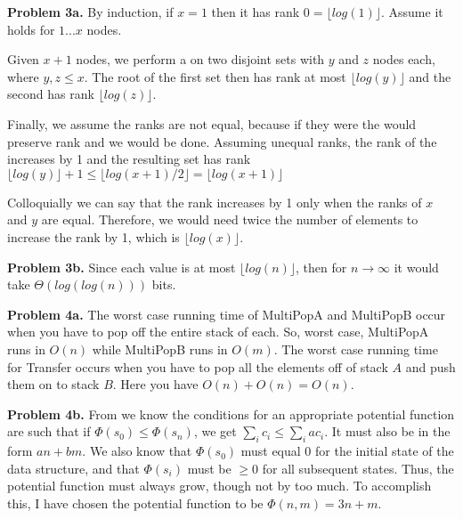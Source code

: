 \documentclass{article}
\begin{document}
\hfill

\textbf{Problem 3a.} By induction, if $x = 1$ then \cite{website:2} it has rank $0 = \lfloor log(1) \rfloor$. Assume it holds for $1...x$ nodes.

\hfill

Given $x + 1$ nodes, we perform a  on two disjoint sets with $y$ and $z$ nodes each, where $y,z \leq x$. The root of the first set then has rank at most $\lfloor log(y) \rfloor$ and the second has rank $\lfloor log(z) \rfloor$.

\hfill

Finally, we assume the ranks are not equal, because if they were the  would preserve rank and we would be done. Assuming unequal ranks, the rank of the  increases by 1 and the resulting set has rank $\lfloor log(y) \rfloor + 1 \leq \lfloor log(x+1)/2 \rfloor = \lfloor log(x+1) \rfloor$

\hfill

Colloquially we can say that the rank increases by 1 only when the ranks of $x$ and $y$ are equal. Therefore, we would need twice the number of elements to increase the rank by 1, which is $\lfloor log(x) \rfloor$.

\hfill

\textbf{Problem 3b.} Since each value is at most $\lfloor log(n) \rfloor$, then for $n \rightarrow \infty$ it would take $\Theta(log(log(n)))$ bits.

\hfill

\textbf{Problem 4a.} The worst case running time of MultiPopA and MultiPopB  occur when you have to pop off the entire stack of each. So, worst case, MultiPopA runs in $O(n)$ while MultiPopB runs in $O(m)$. The worst case running time for Transfer occurs when you have to pop all the elements off of stack $A$ and push them on to stack $B$. Here you have $O(n) + O(n) = O(n)$.

\hfill

\textbf{Problem 4b.} From \cite{website:8} we know the conditions for an appropriate potential function are such that if $\Phi(s_0) \leq \Phi(s_n)$, we get $\sum_i c_i \leq \sum_i ac_i$. It must also be in the form $an + bm$. We also know that $\Phi(s_0)$ must equal $0$ for the initial state of the data structure, and that $\Phi(s_i)$ must be $\geq 0$ for all subsequent states. Thus, the potential function must always grow, though not by too much. To accomplish this, I have chosen the potential function to be $\Phi(n, m) = 3n + m$.

\hfill
\end{document}
